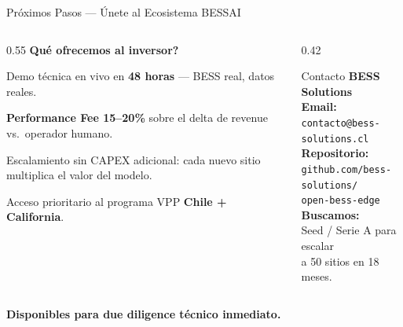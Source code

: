 \documentclass[10pt,aspectratio=169]{beamer}
\let\tempone\itemize
\let\temptwo\enditemize
\renewenvironment{itemize}{\tempone\addtolength{\itemsep}{0.3em}}{\temptwo}
\begin{document}
\begin{frame}{\color{accentorange}Pr\'oximos Pasos --- \'Unete al Ecosistema BESSAI}
  \vspace{0.2cm}
  \begin{columns}[T]
    \begin{column}{0.55\textwidth}
      \textbf{\color{textlight}\textquestiondown Qu\'e ofrecemos al inversor?}
      \begin{itemize}
        \item Demo t\'ecnica en vivo en \textbf{48 horas} --- BESS real, datos reales.
        \item \textbf{Performance Fee 15--20\%} sobre el delta de revenue vs.\ operador humano.
        \item Escalamiento sin CAPEX adicional: cada nuevo sitio multiplica el valor del modelo.
        \item Acceso prioritario al programa VPP \textbf{Chile + California}.
      \end{itemize}
    \end{column}
    \begin{column}{0.42\textwidth}
      \begin{block}{Contacto}
        \vspace{0.15cm}
        \textbf{\color{accentorange}BESS Solutions}\\[0.2cm]
        \footnotesize
        \textbf{Email:}\\
        \texttt{contacto@bess-solutions.cl}\\[0.25cm]
        \textbf{Repositorio:}\\
        \texttt{github.com/bess-solutions/}\\
        \texttt{open-bess-edge}\\[0.25cm]
        \textbf{Buscamos:}\\
        Seed / Serie A para escalar\\ a 50 sitios en 18 meses.
      \end{block}
    \end{column}
  \end{columns}
  \vspace{0.3cm}
  \centering\textcolor{accentorange}{\large\textbf{Disponibles para due diligence t\'ecnico inmediato.}}
\end{frame}
\end{document}
